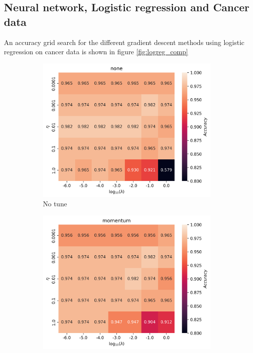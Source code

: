 \documentclass[11pt]{article}
\begin{document}
\subsection{Neural network, Logistic regression and Cancer data}
An accuracy grid search for the different gradient descent methods using logistic regression on cancer data is shown in figure \ref{fig:logreg_comp}
\begin{figure}[H]
    \begin{subfigure}{.5\textwidth}
        \centering
        \includegraphics[width=.95\textwidth]{../figures/logreg_none.png}
        \caption{No tune}
        \label{fig:}
    \end{subfigure}
    \begin{subfigure}{.5\textwidth}
        \centering
        \includegraphics[width=.95\textwidth]{../figures/logreg_momentum.png}

\end{subfigure}
\end{figure}
\end{document}
